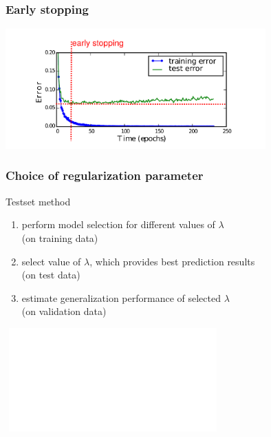 \begin{frame} \frametitle{Early stopping}
	\begin{center}
		\includegraphics[width=10cm]{img/early_stopping.pdf}
	\end{center}
\end{frame}



\begin{frame}\frametitle{Choice of regularization parameter}
	\begin{block}{Testset method}
		\begin{enumerate}
		  \item perform model selection for different values of $\lambda$\\ 
		  		(on training data) 
		  \item<2-> select value of $\lambda$, 
		  		which provides best prediction results\\ 
				(on test data) 
		  \item<3-> estimate generalization performance of selected $\lambda$\\
		  		(on validation data)
		\end{enumerate}
	\end{block}	
	
	\vspace{1cm} 
	
	$ $\hspace{1cm}
	\includegraphics<1->[width=8cm]{img/traintestvalidation.pdf} 
\end{frame}



